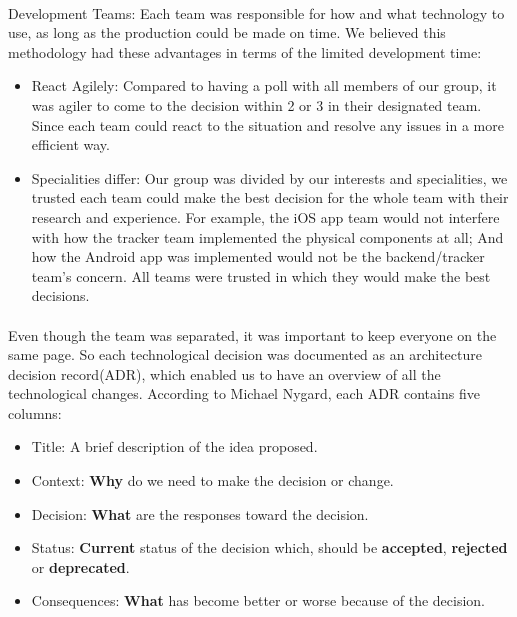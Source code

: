 \documentclass[12pt,a4paper]{article}
\begin{document}
        \paragraph{}Development Teams: Each team was responsible for how and what technology to use, as long as the production could be made on time. We believed this methodology had these advantages in terms of the limited development time:

        \begin{itemize}
          \item {React Agilely}: Compared to having a poll with all members of our group, it was agiler to come to the decision within 2 or 3 in their designated team. Since each team could react to the situation and resolve any issues in a more efficient way.
          \item {Specialities differ}: Our group was divided by our interests and specialities, we trusted each team could make the best decision for the whole team with their research and experience. For example, the iOS app team would not interfere with how the tracker team implemented the physical components at all; And how the Android app was implemented would not be the backend/tracker team's concern. All teams were trusted in which they would make the best decisions.
        \end{itemize}
        
        \paragraph{}Even though the team was separated, it was important to keep everyone on the same page. So each technological decision was documented as an architecture decision record(ADR), which enabled us to have an overview of all the technological changes. According to Michael Nygard, each ADR contains five columns\cite{ArchitectureDecisionRecord}: 

        \begin{itemize}
          \item Title: A brief description of the idea proposed.
          \item Context: {\bf Why} do we need to make the decision or change.                   
          \item Decision: {\bf What} are the responses toward the decision.
          \item Status: {\bf Current} status of the decision which, should be {\bf accepted}, {\bf rejected} or {\bf deprecated}.
          \item Consequences: {\bf What} has become better or worse because of the decision.
        \end{itemize}
\end{document}
